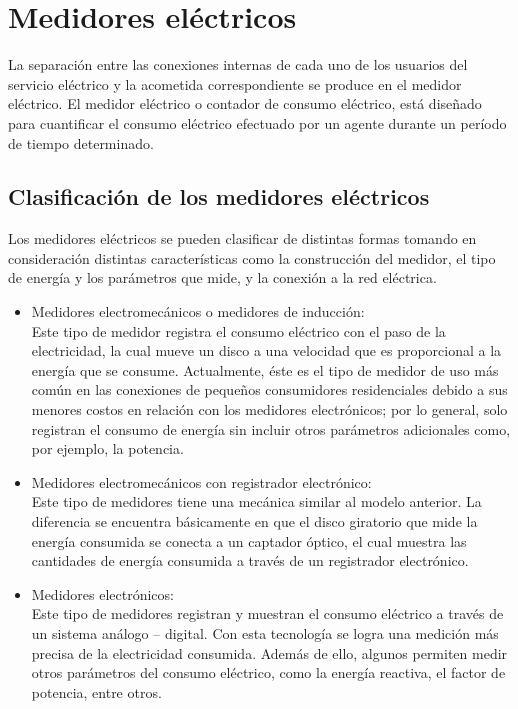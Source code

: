 \documentclass[a4paper,12pt]{report}
\begin{document}
\chapter{Medidores eléctricos}
La separación entre las conexiones internas de cada uno de los usuarios del servicio eléctrico y la acometida correspondiente se produce en el medidor eléctrico.  El medidor eléctrico o contador de consumo eléctrico, está diseñado para cuantificar el consumo eléctrico efectuado por un agente durante un período de tiempo determinado.
\section{Clasificación de los medidores eléctricos}
Los medidores eléctricos se pueden clasificar de distintas formas tomando en consideración distintas características como la construcción del medidor, el tipo de energía y los parámetros que mide, y la conexión a la red eléctrica.
\begin{itemize}
\item Medidores electromecánicos o medidores de inducción:\\
Este tipo de medidor registra el consumo eléctrico con el paso de la electricidad, la cual mueve un disco a una velocidad que es proporcional a la energía que se consume. Actualmente, éste es el tipo de medidor de uso más común en las conexiones de pequeños consumidores residenciales debido a sus menores costos en relación con los medidores electrónicos; por lo general, solo registran el consumo de energía sin incluir otros parámetros adicionales como, por ejemplo, la potencia.
\item Medidores electromecánicos con registrador electrónico: \\
Este tipo de medidores tiene una mecánica similar al modelo anterior. La diferencia se encuentra básicamente en que el disco giratorio que mide la energía consumida se conecta a un captador óptico, el cual muestra las cantidades de energía consumida a través de un registrador electrónico.
\item Medidores electrónicos: \\
Este tipo de medidores registran y muestran el consumo eléctrico a través de un sistema análogo – digital. Con esta tecnología se logra una medición más precisa de la electricidad consumida. Además de ello, algunos permiten medir otros parámetros del consumo eléctrico, como la energía reactiva, el factor de potencia, entre otros.
\end{itemize}
\end{document}
